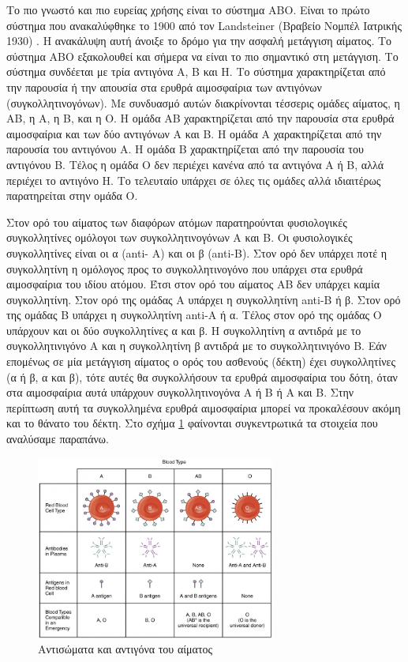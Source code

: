 			Το πιο γνωστό και πιο ευρείας χρήσης είναι το σύστημα ΑΒΟ. Είναι το πρώτο σύστημα που ανακαλύφθηκε το 1900 από τον Landsteiner (Βραβείο Νομπέλ Ιατρικής 1930) \cite{landsteinerABO}. Η ανακάλυψη αυτή άνοιξε το δρόμο για την ασφαλή μετάγγιση αίματος. Το σύστημα ΑΒΟ εξακολουθεί και σήμερα να είναι το πιο σημαντικό στη μετάγγιση. Το σύστημα συνδέεται με τρία αντιγόνα Α, Β και Η. Το σύστημα χαρακτηρίζεται από την παρουσία ή την απουσία στα ερυθρά αιμοσφαίρια των αντιγόνων (συγκολλητινογόνων). Με συνδυασμό αυτών διακρίνονται τέσσερις ομάδες αίματος, η ΑΒ, η Α, η Β, και η Ο. Η ομάδα ΑΒ χαρακτηρίζεται από την παρουσία στα ερυθρά αιμοσφαίρια και των δύο αντιγόνων Α και Β. Η ομάδα Α χαρακτηρίζεται από την παρουσία του αντιγόνου Α. Η ομάδα Β χαρακτηρίζεται από την παρουσία του αντιγόνου Β. Τέλος η ομάδα Ο δεν περιέχει κανένα από τα αντιγόνα Α ή Β, αλλά περιέχει το αντιγόνο Η. Το τελευταίο υπάρχει σε όλες τις ομάδες αλλά ιδιαιτέρως παρατηρείται στην ομάδα Ο.
			
			Στον ορό του αίματος των διαφόρων ατόμων παρατηρούνται φυσιολογικές συγκολλητίνες ομόλογοι των συγκολλητινογόνων Α και Β. Οι φυσιολογικές συγκολλητίνες είναι οι α (anti- A) και οι β (anti-B). Στον ορό δεν υπάρχει ποτέ η συγκολλητίνη η ομόλογος προς το συγκολλητινογόνο που υπάρχει στα ερυθρά αιμοσφαίρια του ιδίου ατόμου. Έτσι στον ορό του αίματος ΑΒ δεν υπάρχει καμία συγκολλητίνη. Στον ορό της ομάδας Α υπάρχει η συγκολλητίνη anti-B ή β. Στον ορό της ομάδας Β υπάρχει η συγκολλητίνη anti-Α ή α. Τέλος στον ορό της ομάδας Ο υπάρχουν και οι δύο συγκολλητίνες α και β. Η συγκολλητίνη α αντιδρά με το συγκολλητινιγόνο Α και η συγκολλητίνη β αντιδρά με το συγκολλητινιγόνο Β. Εάν επομένως σε μία μετάγγιση αίματος ο ορός του ασθενούς (δέκτη) έχει συγκολλητίνες (α ή β, α και β), τότε αυτές θα συγκολλήσουν τα ερυθρά αιμοσφαίρια του δότη, όταν στα αιμοσφαίρια αυτά υπάρχουν συγκολλητινογόνα Α ή Β ή Α και Β. Στην περίπτωση αυτή τα συγκολλημένα ερυθρά αιμοσφαίρια μπορεί να προκαλέσουν ακόμη και το θάνατο του δέκτη. Στο σχήμα \ref{fig:blood_antibodies_antigons} φαίνονται συγκεντρωτικά τα στοιχεία που αναλύσαμε παραπάνω.		
	\begin{figure}[h!]
	    \centering
	    \includegraphics[width=0.7\textwidth]{blood_antibodies_antigons.jpg}
	    \caption{Αντισώματα και αντιγόνα του αίματος}
	    \label{fig:blood_antibodies_antigons}
	\end{figure}
			
